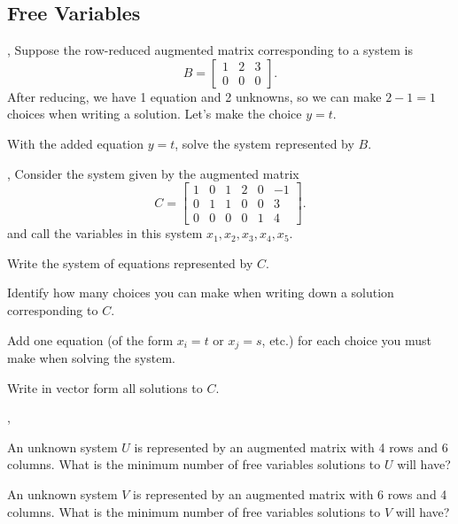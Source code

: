\documentclass[letter]{article}
\begin{document}
\subsection*{Free Variables}
	\sep
	Suppose the row-reduced augmented matrix corresponding to 
	a system is
	\[
		B=\left[\begin{array}{cc|c}
			1 & 2 & 3\\
			0 & 0 & 0
		\end{array}\right].
	\]
	After reducing, we have 1 equation and 2 unknowns, so we can make
	$2-1=1$ choices when writing a solution.  Let's make the
	choice $y=t$.
	
	\begin{Enum}
		\item With the added equation $y=t$, solve the
		system represented by $B$.
	\end{Enum}

	\sep
	Consider the system given by the augmented matrix
	\[
		C=\left[\begin{array}{ccccc|c}
			1&0&1&2&0&-1\\
			0&1&1&0&0&3\\
			0&0&0&0&1&4
		\end{array}\right].
	\]
	and call the variables in this system $x_1,x_2,
	x_3,x_4,x_5$.

	\begin{Enum}
		\item Write the system of equations represented by $C$.
		\item Identify how many choices you can make when writing
		down a solution corresponding to $C$.
		\item Add one equation (of the form $x_i=t$ or $x_j=s$, etc.)
		for each choice you must make when solving the system.
		\item Write in vector form all solutions to $C$.
	\end{Enum}

	\sep
	\vspace{-1cm}
	\begin{Enum}
		\item An unknown system $U$ is represented by an augmented
		matrix with 4 rows and 6 columns.  What is 
		the minimum number of
		free variables solutions to $U$ will have?
		\item An unknown system $V$ is represented by an augmented
		matrix with 6 rows and 4 columns.  What is 
		the minimum number of
		free variables solutions to $V$ will have?
	\end{Enum}
	
\end{document}
